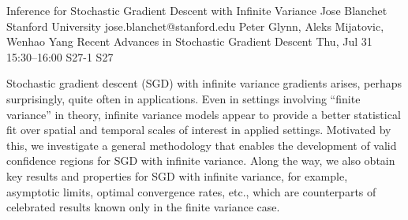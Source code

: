 \begin{talk}
  {Inference for Stochastic Gradient Descent with Infinite Variance}%
  {Jose Blanchet}%
  {Stanford University}%
  {jose.blanchet@stanford.edu}%
  {Peter Glynn, Aleks Mijatovic, Wenhao Yang}%
  {Recent Advances in Stochastic Gradient Descent}%
  {Thu, Jul 31 15:30–16:00}%
  {S27-1}%
  {S27}%
				
                
Stochastic gradient descent (SGD) with infinite variance gradients arises, perhaps surprisingly, quite often in applications. Even in settings involving “finite variance” in theory, infinite variance models appear to provide a better statistical fit over spatial and temporal scales of interest in applied settings. Motivated by this, we investigate a general methodology that enables the development of valid confidence regions for SGD with infinite variance. Along the way, we also obtain key results and properties for SGD with infinite variance, for example, asymptotic limits, optimal convergence rates, etc., which are counterparts of celebrated results known only in the finite variance case.


\medskip


\end{talk}

